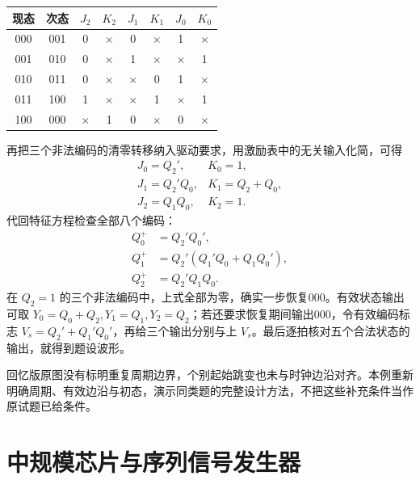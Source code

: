 \documentclass[UTF8,fontset=none,zihao=-4,a4paper]{ctexart}
\newcommand{\chapterpage}[1]{\clearpage\section{#1}}
\begin{document}
\begin{center}
\begin{tabular}{c c cc cc cc}
\toprule 现态&次态&$J_2$&$K_2$&$J_1$&$K_1$&$J_0$&$K_0$\\\midrule
000&001&0&$\times$&0&$\times$&1&$\times$\\
001&010&0&$\times$&1&$\times$&$\times$&1\\
010&011&0&$\times$&$\times$&0&1&$\times$\\
011&100&1&$\times$&$\times$&1&$\times$&1\\
100&000&$\times$&1&0&$\times$&0&$\times$\\\bottomrule
\end{tabular}
\end{center}
再把三个非法编码的清零转移纳入驱动要求，用激励表中的无关输入化简，可得
\[
\begin{array}{lll}
J_0=Q_2',&K_0=1,\\
J_1=Q_2'Q_0,&K_1=Q_2+Q_0,\\
J_2=Q_1Q_0,&K_2=1.
\end{array}
\]
代回特征方程检查全部八个编码：
\begin{align*}
Q_0^+&=Q_2'Q_0',\\
Q_1^+&=Q_2'(Q_1'Q_0+Q_1Q_0'),\\
Q_2^+&=Q_2'Q_1Q_0.
\end{align*}
在 $Q_2=1$ 的三个非法编码中，上式全部为零，确实一步恢复000。有效状态输出可取 $Y_0=Q_0+Q_2,Y_1=Q_1,Y_2=Q_2$；若还要求恢复期间输出000，令有效编码标志 $V_s=Q_2'+Q_1'Q_0'$，再给三个输出分别与上 $V_s$。最后逐拍核对五个合法状态的输出，就得到题设波形。

回忆版原图没有标明重复周期边界，个别起始跳变也未与时钟边沿对齐。本例重新明确周期、有效边沿与初态，演示同类题的完整设计方法，不把这些补充条件当作原试题已给条件。


\chapterpage{中规模芯片与序列信号发生器}
\end{document}
